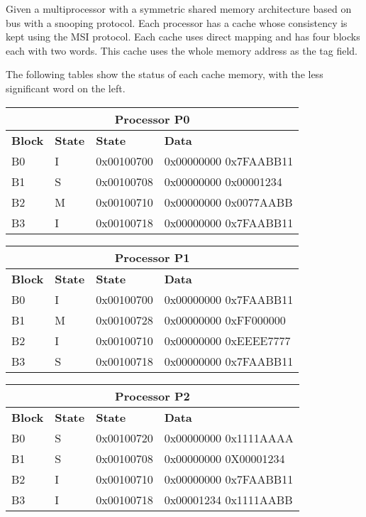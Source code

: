 \begin{acexercise}\end{acexercise}
\label{ex:m5-01:msi-01}

Given a multiprocessor with a symmetric shared memory architecture based
on bus with a snooping protocol. Each processor has a cache
whose consistency is kept using the MSI protocol. Each cache uses
direct mapping and has four blocks each with two words. This
cache uses the whole memory address as the tag field.

The following tables show the status of each cache memory, with the less
significant word on the left.

\medskip

\begin{tabular}{|l|l|l|l|}
\hline
\multicolumn{4}{|c|}{Processor P0}\\
\hline
\textbf{Block} &
\textbf{State} &
\textbf{State} &
\textbf{Data}
\\
\hline
\hline

B0 & I & 0x00100700 & 0x00000000 0x7FAABB11\\
\hline

B1 & S & 0x00100708 & 0x00000000 0x00001234\\
\hline

B2 & M & 0x00100710 & 0x00000000 0x0077AABB\\
\hline

B3 & I & 0x00100718 & 0x00000000 0x7FAABB11\\
\hline
\end{tabular}

\medskip

\begin{tabular}{|l|l|l|l|}
\hline
\multicolumn{4}{|c|}{Processor P1}\\
\hline
\textbf{Block} &
\textbf{State} &
\textbf{State} &
\textbf{Data}
\\
\hline
\hline

B0 & I & 0x00100700 & 0x00000000 0x7FAABB11\\
\hline
B1 & M & 0x00100728 & 0x00000000 0xFF000000\\
\hline
B2 & I & 0x00100710 & 0x00000000 0xEEEE7777\\
\hline
B3 & S & 0x00100718 & 0x00000000 0x7FAABB11\\
\hline
\end{tabular}

\medskip

\begin{tabular}{|l|l|l|l|}
\hline
\multicolumn{4}{|c|}{Processor P2}\\
\hline
\textbf{Block} &
\textbf{State} &
\textbf{State} &
\textbf{Data}
\\
\hline
\hline

B0 & S & 0x00100720 & 0x00000000 0x1111AAAA\\
\hline
B1 & S & 0x00100708 & 0x00000000 0X00001234\\
\hline
B2 & I & 0x00100710 & 0x00000000 0x7FAABB11\\
\hline
B3 & I & 0x00100718 & 0x00001234 0x1111AABB\\
\hline

\end{tabular}

